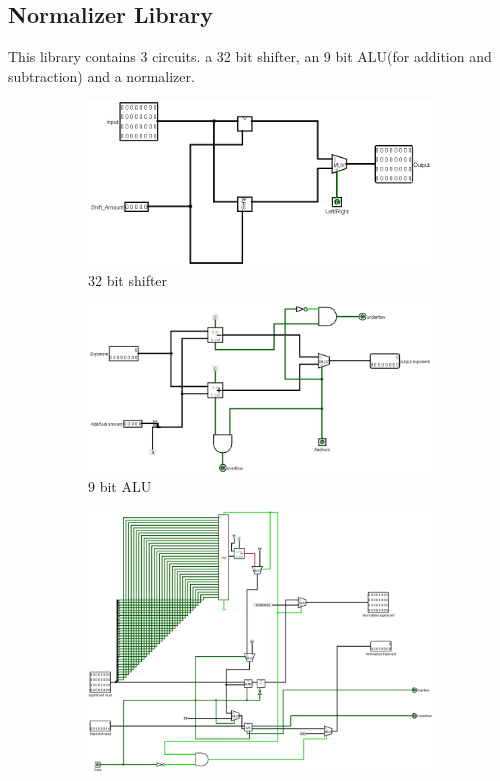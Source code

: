 \documentclass[a4paper,12pt]{article}
\begin{document}
\subsection{Normalizer Library}
This library contains 3 circuits. a 32 bit shifter, an 9 bit ALU(for addition
and subtraction) and a normalizer.
\begin{figure}[H]
    \centering
    \begin{subfigure}[h]{.4\textwidth}
        \centering
        \includegraphics[width=1\textwidth]{normalizer_shifter.png}
        \caption{32 bit shifter}
    \end{subfigure}
    \hfill
    \begin{subfigure}[h]{.4\textwidth}
        \centering
        \includegraphics[width=1\textwidth]{norm_add_sub.png}
        \caption{9 bit ALU}
    \end{subfigure}
    \begin{subfigure}[h]{.8\textwidth}
        \centering
        \includegraphics[width=1\textwidth]{normalizer.png}

\end{subfigure}
\end{figure}
\end{document}
